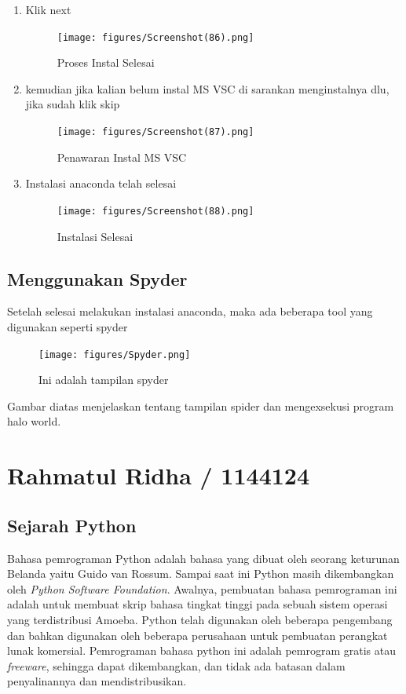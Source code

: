 \begin{enumerate}
    \item Klik next
    \begin{figure}[!Htbp]
        \centering
        \texttt{[image: figures/Screenshot(86).png]}
        \caption{Proses Instal Selesai}
        \label{Proses}
        \end{figure}

    \item kemudian jika kalian belum instal MS VSC di sarankan menginstalnya dlu, jika sudah klik skip
    \begin{figure}[!Htbp]
        \centering
        \texttt{[image: figures/Screenshot(87).png]}
        \caption{Penawaran Instal MS VSC}
        \label{offering}
        \end{figure}

    \item Instalasi anaconda telah selesai
    \begin{figure}[!Htbp]
        \centering
        \texttt{[image: figures/Screenshot(88).png]}
        \caption{Instalasi Selesai}
        \label{akhir}
        \end{figure}
\end{enumerate}
\subsection{Menggunakan Spyder}
Setelah selesai melakukan instalasi anaconda, maka ada beberapa tool yang digunakan seperti spyder

\begin{figure}[!Htbp]
    \centering
    \texttt{[image: figures/Spyder.png]}
    \caption{Ini adalah tampilan spyder}
    \label{spyder}
    \end{figure}

Gambar diatas menjelaskan tentang tampilan spider dan mengexsekusi program halo world.


\section{Rahmatul Ridha / 1144124}
\subsection{Sejarah Python}
Bahasa pemrograman Python adalah bahasa yang dibuat oleh seorang keturunan Belanda yaitu Guido van Rossum. Sampai saat ini Python masih dikembangkan oleh \textit{Python Software Foundation}. Awalnya, pembuatan bahasa pemrograman ini adalah untuk membuat skrip bahasa tingkat tinggi pada sebuah sistem operasi yang terdistribusi Amoeba. Python telah digunakan oleh beberapa pengembang dan bahkan digunakan oleh beberapa perusahaan untuk pembuatan perangkat lunak komersial. Pemrograman bahasa python ini adalah pemrogram gratis atau \textit{freeware}, sehingga dapat dikembangkan, dan tidak ada batasan dalam penyalinannya dan mendistribusikan.

